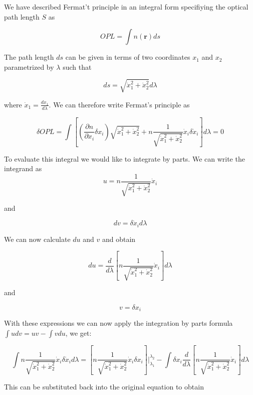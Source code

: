\documentclass[
  a4paper,
]{book}
\begin{document}
\begin{tcolorbox}[enhanced jigsaw, coltitle=black, title=\textcolor{quarto-callout-tip-color}{\faLightbulb}\hspace{0.5em}{Fermats's Principle in Integral and Differential Form}, colframe=quarto-callout-tip-color-frame, toprule=.15mm, opacitybacktitle=0.6, left=2mm, opacityback=0, breakable, toptitle=1mm, bottomtitle=1mm, leftrule=.75mm, arc=.35mm, titlerule=0mm, colbacktitle=quarto-callout-tip-color!10!white, rightrule=.15mm, bottomrule=.15mm, colback=white]

We have described Fermat't principle in an integral form specifiying the
optical path length \(S\) as

\[
OPL=\int n(\textbf{r})ds
\]

The path length \(ds\) can be given in terms of two coordinates \(x_1\)
and \(x_2\) parametrized by \(\lambda\) such that

\[
ds=\sqrt{\dot{x}_1^{2}+\dot{x}_2^{2}}d\lambda
\]

where \(\dot{x}_1=\frac{dx_{1}}{d\lambda}\). We can therefore write
Fermat's principle as

\[
\delta OPL=\int\left[\left(\frac{\partial n}{\partial x_i} \delta x_i\right) \sqrt{\dot{x}_1^2+\dot{x}_2^2}+n \frac{1}{\sqrt{\dot{x}_1^2+\dot{x}_2^2}} \dot{x}_i \delta \dot{x}_i\right] d \lambda = 0
\]

To evaluate this integral we would like to integrate by parts. We can
write the integrand as \[
u = n \frac{1}{\sqrt{\dot{x}_1^2+\dot{x}_2^2}} \dot{x}_i
\]

and

\[
dv = \delta \dot{x}_i d\lambda
\]

We can now calculate \(du\) and \(v\) and obtain

\[
du = \frac{d}{d\lambda}\left[n \frac{1}{\sqrt{\dot{x}_1^2+\dot{x}_2^2}} \dot{x}_i\right] d\lambda
\]

and

\[
v = \delta x_i
\]

With these expressions we can now apply the integration by parts formula
\(\int u dv = uv - \int v du\), we get:

\[
\int n \frac{1}{\sqrt{\dot{x}_1^2+\dot{x}_2^2}} \dot{x}_i \delta \dot{x}_i d\lambda = \left[n \frac{1}{\sqrt{\dot{x}_1^2+\dot{x}_2^2}} \dot{x}_i \delta x_i\right]|_{\lambda_1}^{\lambda_2} - \int \delta x_i \frac{d}{d\lambda}\left[n \frac{1}{\sqrt{\dot{x}_1^2+\dot{x}_2^2}} \dot{x}_i\right] d\lambda
\]

This can be substituted back into the original equation to obtain


\end{tcolorbox}
\end{document}
